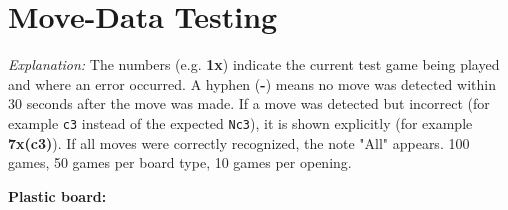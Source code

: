\chapter{Move-Data Testing}
\label{app:move-data-testing}


\par\scriptsize
\textit{Explanation:} The numbers (e.g. \textbf{1x}) indicate the current test game being played and where an error occurred. A hyphen (\textbf{-}) means no move was detected within 30 seconds after the move was made. If a move was detected but incorrect (for example \texttt{c3} instead of the expected \texttt{Nc3}), it is shown explicitly (for example \textbf{7x(c3)}). If all moves were correctly recognized, the note "All" appears. 100 games, 50 games per board type, 10 games per opening.

\normalsize %

\begin{center}
\footnotesize  %
\textbf{Plastic board:}
\end{center}

